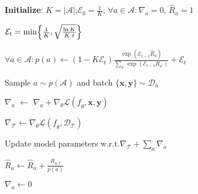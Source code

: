 \begin{algorithm}[t]
\begin{algorithmic}[1]
\STATE \textbf{Initialize}: $K=\vert \mathcal{A} \vert$;\quad$\mathcal{E}_{0} = \frac{1}{K}$;
\STATEX \quad$\forall a\in \mathcal{A}: \nabla_{a} = 0$, $\hat{R}_{a} = 1$

    
    \STATE $\mathcal{E}_{t} = \min \Bigl\{\frac{1}{K}, \sqrt{\frac{\ln K}{K \cdot t}} \Bigr\}$ %
    
    \STATE $\forall a\in\mathcal{A}: p(a) \gets (1-K\mathcal{E}_{t})\frac{\exp(\mathcal{E}_{t-1}\hat{R}_{a})}{\sum_{a^{\prime}} \exp(\mathcal{E}_{t-1}R_{a^{\prime}})}+\mathcal{E}_{t}$ %
    
    \STATE Sample $a\sim p(\mathcal{A})$ and batch $\{\mathbf{x},\mathbf{y}\} \sim \mathcal{D}_{a}$
    
    \STATE $\nabla_{a}$ $\gets$ $\nabla_{a}+\nabla_{\theta}\mathcal{L}(\mathit{f}_{\theta},\mathbf{x},\mathbf{y})$%
    
        
        \STATE $\nabla_{\mathcal{T}}\gets\nabla_{\theta}\mathcal{L}(\mathit{f}_{\theta},\mathcal{D}_{\mathcal{T}})$ %
        
        \STATE Update model parameters w.r.t.$\nabla_{\mathcal{T}}+\sum_{a}\nabla_{a}$
        
        
            \STATE $\hat{R}_{a} \gets \hat{R}_{a} + \frac{R_{a,t}}{p(a)}$
            
            \STATE $\nabla_{a}\gets 0$ %
        \ENDFOR
    \ENDIF
\ENDFOR


\end{algorithmic}
\end{algorithm}


